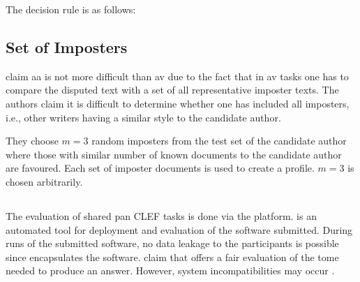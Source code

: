 The decision rule is as follows:


\subsection{Set of Imposters}

\citet{kocher_unine_2015} claim \ac{aa} is not more difficult than \ac{av} 
due to the fact that in \ac{av} tasks one has to compare the disputed text with a set of all representative imposter texts.
The authors claim it is difficult to determine whether one has included all imposters, 
i.e., other writers having a similar style to the candidate author.

They choose $m=3$ random imposters from the test set of the candidate author 
where those with similar number of known documents to the candidate author are favoured.
Each set of imposter documents is used to create a profile.
$m=3$ is chosen arbitrarily.

\subsection{\tira{}}
\label{sec:tira}

The evaluation of shared \ac{pan} CLEF tasks is done via the \tira{} platform.
\tira{} is an automated tool for deployment and evaluation of the software submitted.
During runs of the submitted software, no data leakage to the participants is possible since \tira{} encapsulates the software.
\citet{kocher_unine_2015} claim that \tira{} offers a fair evaluation of the tome needed to produce an answer.
However, system incompatibilities may occur \cite{kocher_unine_2015}.

